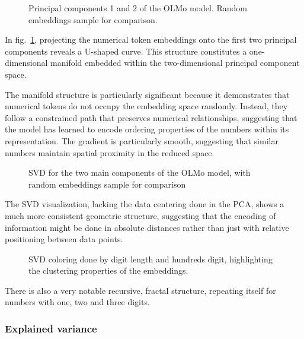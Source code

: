 \documentclass[
  a4paper, twoside, 10pt, titlepage]{book}
\makeatletter
\newcommand*\pandocbounded[1]{%
  \sbox\pandoc@box{#1}%
  \Gscale@div\@tempa{\textheight}{\dimexpr\ht\pandoc@box+\dp\pandoc@box\relax}%
  \Gscale@div\@tempb{\linewidth}{\wd\pandoc@box}%
  \ifdim\@tempb\p@<\@tempa\p@\let\@tempa\@tempb\fi%
  \ifdim\@tempa\p@<\p@\scalebox{\@tempa}{\usebox\pandoc@box}%
  \else\usebox{\pandoc@box}%
  \fi%
}
\makeatother
\begin{document}
\begin{figure}
\centering
\pandocbounded{}
\caption{Principal components 1 and 2 of the OLMo model. Random
embeddings sample for comparison.}\label{fig:olmo_pca}
\end{figure}

In fig.~\ref{fig:olmo_pca}, projecting the numerical token embeddings
onto the first two principal components reveals a U-shaped curve. This
structure constitutes a one-dimensional manifold embedded within the
two-dimensional principal component space.

The manifold structure is particularly significant because it
demonstrates that numerical tokens do not occupy the embedding space
randomly. Instead, they follow a constrained path that preserves
numerical relationships, suggesting that the model has learned to encode
ordering properties of the numbers within its representation. The
gradient is particularly smooth, suggesting that similar numbers
maintain spatial proximity in the reduced space.

\begin{figure}
\centering
\pandocbounded{}
\caption{SVD for the two main components of the OLMo model, with random
embeddings sample for comparison}\label{fig-olmo-svd}
\end{figure}

The SVD visualization, lacking the data centering done in the PCA, shows
a much more consistent geometric structure, suggesting that the encoding
of information might be done in absolute distances rather than just with
relative positioning between data points.

\begin{figure}
\centering
\pandocbounded{}
\caption{SVD coloring done by digit length and hundreds digit,
highlighting the clustering properties of the
embeddings.}\label{fig-olmo-svd-digits}
\end{figure}

There is also a very notable recursive, fractal structure, repeating
itself for numbers with one, two and three digits.

\subsubsection{Explained variance}\label{explained-variance}
\end{document}
